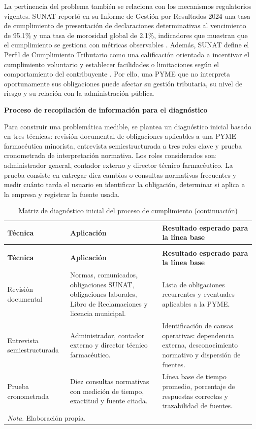 \documentclass[12pt,a4paper,oneside]{report}
\begin{document}
La pertinencia del problema también se relaciona con los mecanismos regulatorios vigentes. SUNAT reportó en su Informe de Gestión por Resultados 2024 una tasa de cumplimiento de presentación de declaraciones determinativas al vencimiento de 95.1\% y una tasa de morosidad global de 2.1\%, indicadores que muestran que el cumplimiento se gestiona con métricas observables \parencite{sunatGestion2024}. Además, SUNAT define el Perfil de Cumplimiento Tributario como una calificación orientada a incentivar el cumplimiento voluntario y establecer facilidades o limitaciones según el comportamiento del contribuyente \parencite{sunatPerfilCumplimiento2026}. Por ello, una PYME que no interpreta oportunamente sus obligaciones puede afectar su gestión tributaria, su nivel de riesgo y su relación con la administración pública.

\textbf{Proceso de recopilación de información para el diagnóstico}

Para construir una problemática medible, se plantea un diagnóstico inicial basado en tres técnicas: revisión documental de obligaciones aplicables a una PYME farmacéutica minorista, entrevista semiestructurada a tres roles clave y prueba cronometrada de interpretación normativa. Los roles considerados son: administrador general, contador externo y director técnico farmacéutico. La prueba consiste en entregar diez cambios o consultas normativas frecuentes y medir cuánto tarda el usuario en identificar la obligación, determinar si aplica a la empresa y registrar la fuente usada.

\begin{longtable}{@{}p{}p{}p{}@{}}
\caption{Matriz de diagnóstico inicial del proceso de cumplimiento}\label{tab:matriz-diagnostico}\\
\toprule
\textbf{Técnica} & \textbf{Aplicación} & \textbf{Resultado esperado para la línea base} \\
\midrule
\endfirsthead
\caption[]{Matriz de diagnóstico inicial del proceso de cumplimiento (continuación)}\\
\toprule
\textbf{Técnica} & \textbf{Aplicación} & \textbf{Resultado esperado para la línea base} \\
\midrule
\endhead
Revisión documental & Normas, comunicados, obligaciones SUNAT, obligaciones laborales, Libro de Reclamaciones y licencia municipal. & Lista de obligaciones recurrentes y eventuales aplicables a la PYME. \\
Entrevista semiestructurada & Administrador, contador externo y director técnico farmacéutico. & Identificación de causas operativas: dependencia externa, desconocimiento normativo y dispersión de fuentes. \\
Prueba cronometrada & Diez consultas normativas con medición de tiempo, exactitud y fuente citada. & Línea base de tiempo promedio, porcentaje de respuestas correctas y trazabilidad de fuentes. \\
\bottomrule
\multicolumn{3}{p{0.94\textwidth}}{\normalsize \textit{Nota.} Elaboración propia.}\\
\end{longtable}
\end{document}
